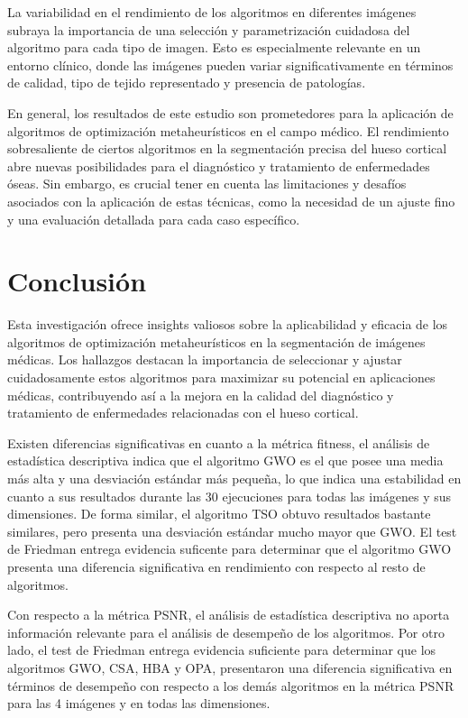 \documentclass[conference]{IEEEtran}
\begin{document}
\noindent La variabilidad en el rendimiento de los algoritmos en diferentes imágenes subraya la importancia de una selección y parametrización cuidadosa del algoritmo para cada tipo de imagen. Esto es especialmente relevante en un entorno clínico, donde las imágenes pueden variar significativamente en términos de calidad, tipo de tejido representado y presencia de patologías.

\noindent En general, los resultados de este estudio son prometedores para la aplicación de algoritmos de optimización metaheurísticos en el campo médico. El rendimiento sobresaliente de ciertos algoritmos en la segmentación precisa del hueso cortical abre nuevas posibilidades para el diagnóstico y tratamiento de enfermedades óseas. Sin embargo, es crucial tener en cuenta las limitaciones y desafíos asociados con la aplicación de estas técnicas, como la necesidad de un ajuste fino y una evaluación detallada para cada caso específico.





\section{Conclusión} \label{sec:co}

\noindent Esta investigación ofrece insights valiosos sobre la aplicabilidad y eficacia de los algoritmos de optimización metaheurísticos en la segmentación de imágenes médicas. Los hallazgos destacan la importancia de seleccionar y ajustar cuidadosamente estos algoritmos para maximizar su potencial en aplicaciones médicas, contribuyendo así a la mejora en la calidad del diagnóstico y tratamiento de enfermedades relacionadas con el hueso cortical.

\noindent Existen diferencias significativas en cuanto a la métrica fitness, el análisis de estadística descriptiva indica que el algoritmo GWO es el que posee una media más alta y una desviación estándar más pequeña, lo que indica una estabilidad en cuanto a sus resultados durante las 30 ejecuciones para todas las imágenes y sus dimensiones. De forma similar, el algoritmo TSO obtuvo resultados bastante similares, pero presenta una desviación estándar mucho mayor que GWO. El test de Friedman entrega evidencia suficente para determinar que el algoritmo GWO presenta una diferencia significativa en rendimiento con respecto al resto de algoritmos.

\noindent Con respecto a la métrica PSNR, el análisis de estadística descriptiva no aporta información relevante para el análisis de desempeño de los algoritmos. Por otro lado, el test de Friedman entrega evidencia suficiente para determinar que los algoritmos GWO, CSA, HBA y OPA, presentaron una diferencia significativa en términos de desempeño con respecto a los demás algoritmos en la métrica PSNR para las 4 imágenes y en todas las dimensiones.
\end{document}

